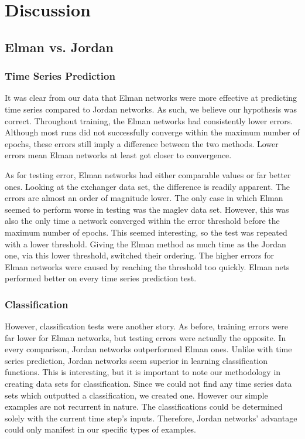 \documentclass{article}
\begin{document}
\section{Discussion}
\subsection{Elman vs. Jordan}
\subsubsection{Time Series Prediction}
It was clear from our data that Elman networks were more effective at predicting time series compared to Jordan networks.
As such, we believe our hypothesis was correct.
Throughout training, the Elman networks had consistently lower errors.
Although most runs did not successfully converge within the maximum number of epochs, these errors still imply a difference between the two methods.
Lower errors mean Elman networks at least got closer to convergence.

As for testing error, Elman networks had either comparable values or far better ones.
Looking at the exchanger data set, the difference is readily apparent.
The errors are almost an order of magnitude lower.
The only case in which Elman seemed to perform worse in testing was the maglev data set.
However, this was also the only time a network converged within the error threshold before the maximum number of epochs.
This seemed interesting, so the test was repeated with a lower threshold.
Giving the Elman method as much time as the Jordan one, via this lower threshold, switched their ordering.
The higher errors for Elman networks were caused by reaching the threshold too quickly.
Elman nets performed better on every time series prediction test.

\subsubsection{Classification}
However, classification tests were another story.
As before, training errors were far lower for Elman networks, but testing errors were actually the opposite.
In every comparison, Jordan networks outperformed Elman ones.
Unlike with time series prediction, Jordan networks seem superior in learning classification functions.
This is interesting, but it is important to note our methodology in creating data sets for classification.
Since we could not find any time series data sets which outputted a classification, we created one.
However our simple examples are not recurrent in nature.
The classifications could be determined solely with the current time step's inputs.
Therefore, Jordan networks' advantage could only manifest in our specific types of examples.
\end{document}

